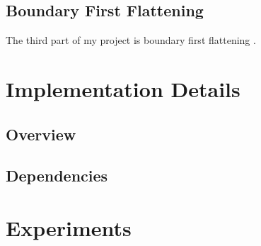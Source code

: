 \documentclass[fleqn,10pt]{wlscirep}
\begin{document}
\subsection{Boundary First Flattening}
The third part of my project is boundary first flattening \cite{1704.06873}. 
\section{Implementation Details}
\subsection{Overview}
\subsection{Dependencies}
\cite{eigenweb}\cite{libigl}\cite{LBFGSpp}\cite{Botsch02openmesh}


\section{Experiments}

 






\end{document}
